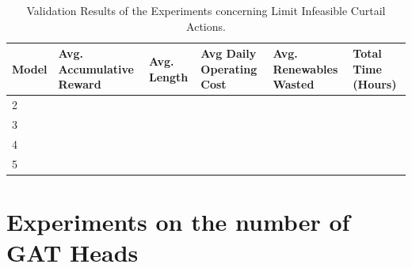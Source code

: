\begin{table}[ht]
	\centering
	\begin{tabularx}{\textwidth}{|l|X|X|X|X|X|}
		\hline
		\textbf{Model} & \textbf{Avg. Accumulative Reward }& \textbf{Avg. Length} & \textbf{Avg Daily Operating Cost} & \textbf{Avg. Renewables Wasted} & \textbf{Total Time (Hours)}\\
		\hline
		2 & & & & & \\
		3 & & & & & \\
		4 & & & & & \\
		5 & & & & & \\
		\hline
	\end{tabularx}
	\caption{Validation Results of the Experiments concerning Limit Infeasible Curtail Actions.}
	\label{fig:curtail-val}
\end{table}


\section{Experiments on the number of \ac{GAT} Heads}

